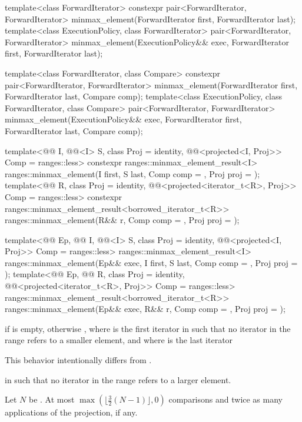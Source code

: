 %
\begin{itemdecl}
template<class ForwardIterator>
  constexpr pair<ForwardIterator, ForwardIterator>
    minmax_element(ForwardIterator first, ForwardIterator last);
template<class ExecutionPolicy, class ForwardIterator>
  pair<ForwardIterator, ForwardIterator>
    minmax_element(ExecutionPolicy&& exec,
                   ForwardIterator first, ForwardIterator last);

template<class ForwardIterator, class Compare>
  constexpr pair<ForwardIterator, ForwardIterator>
    minmax_element(ForwardIterator first, ForwardIterator last, Compare comp);
template<class ExecutionPolicy, class ForwardIterator, class Compare>
  pair<ForwardIterator, ForwardIterator>
    minmax_element(ExecutionPolicy&& exec,
                   ForwardIterator first, ForwardIterator last, Compare comp);

template<@@ I, @@<I> S, class Proj = identity,
         @@<projected<I, Proj>> Comp = ranges::less>
  constexpr ranges::minmax_element_result<I>
    ranges::minmax_element(I first, S last, Comp comp = {}, Proj proj = {});
template<@@ R, class Proj = identity,
         @@<projected<iterator_t<R>, Proj>> Comp = ranges::less>
  constexpr ranges::minmax_element_result<borrowed_iterator_t<R>>
    ranges::minmax_element(R&& r, Comp comp = {}, Proj proj = {});

template<@@ Ep, @@ I, @@<I> S,
         class Proj = identity,
         @@<projected<I, Proj>> Comp = ranges::less>
  ranges::minmax_element_result<I>
    ranges::minmax_element(Ep&& exec, I first, S last, Comp comp = {}, Proj proj = {});
template<@@ Ep, @@ R, class Proj = identity,
         @@<projected<iterator_t<R>, Proj>> Comp = ranges::less>
  ranges::minmax_element_result<borrowed_iterator_t<R>>
    ranges::minmax_element(Ep&& exec, R&& r, Comp comp = {}, Proj proj = {});
\end{itemdecl}


\begin{itemdescr}
\pnum
\returns
{} if  is empty, otherwise
, where  is
the first iterator in  such that no iterator in the range refers
to a smaller element, and where  is the last iterator
\begin{footnote}
This behavior
intentionally differs from .
\end{footnote}
in  such that no iterator in the range refers to a larger element.

\pnum
\complexity
Let $N$ be .
At most $\max(\bigl\lfloor{\frac{3}{2}} (N-1)\bigr\rfloor, 0)$ comparisons and
twice as many applications of the projection, if any.
\end{itemdescr}

